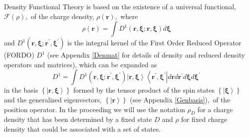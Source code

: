 \documentclass[aps,preprint]{revtex4}%
\begin{document}
Density Functional Theory is based on the existence of a universal functional,
$\mathcal{F}\left(  \rho\right)  ,$ of the charge density, $\rho\left(
\boldsymbol{r}\right)  ,$ where
\begin{equation}
\rho\left(  \boldsymbol{r}\right)  =\int D^{1}\left(  \boldsymbol{r,\xi;r,\xi
}\right)  d\boldsymbol{\xi}%
\end{equation}
and $D^{1}\left(  \boldsymbol{r,\xi;r}^{\prime}\boldsymbol{,\xi}^{\prime
}\right)  $ is the integral kernel of the First Order Reduced Operator (FORDO)
$D^{1}$ (see Appendix \ref{Denmat} for details of density and reduced density
operators and matrices), which can be expanded as
\begin{equation}
D^{1}=\int D^{1}\left(  \boldsymbol{r,\xi;r}^{\prime}\boldsymbol{,\xi}%
^{\prime}\right)  \left\vert \boldsymbol{r,\xi}\right\rangle \left\langle
\boldsymbol{r}^{\prime}\boldsymbol{,\xi}^{\prime}\right\vert d\boldsymbol{r}%
d\boldsymbol{r}^{\prime}d\boldsymbol{\xi}d\boldsymbol{\xi}^{\prime}%
\end{equation}
in the basis $\left\{  \left\vert \boldsymbol{r,\xi}\right\rangle \right\}  $
formed by the tensor product of the spin states $\left\{  \left\vert
\boldsymbol{\xi}\right\rangle \right\}  $ and the generalized eigenvectors,
$\left\{  \left\vert \boldsymbol{r}\right\rangle \right\}  $ (see Appendix
\ref{Genbasis})$,$ of the position operator. In the proceeding we will use the
notation $\rho_{D}$ for a charge density that has been determined by a fixed
state $D$ and $\rho$ for fixed charge density that could be associated with a
set of states.
\end{document}
